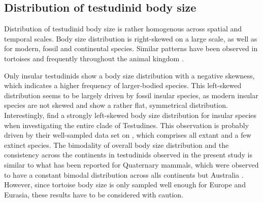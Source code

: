 






\subsection{Distribution of testudinid body size}

Distribution of testudinid body size is rather homogenous across spatial and temporal scales.
Body size distribution is right-skewed on a large scale, as well as for modern, fossil and continental species. Similar patterns have been observed in tortoises \citep{Angielczyk2015,Jaffe2011a} and frequently throughout the animal kingdom \citep{Blackburn1994a,Kozlowski2002}.

Only insular testudinids show a body size distribution with a negative skewness, which indicates a higher frequency of larger-bodied species. This left-skewed distribution seems to be largely driven by fossil insular species, as modern insular species are not skewed and show a rather flat, symmetrical distribution. Interestingly, \cite{Angielczyk2015} find a strongly left-skewed body size distribution for insular species when investigating the entire clade of Testudines. This observation is probably driven by their well-sampled data set on \T, which comprises all extant and a few extinct species. 
The bimodality of overall body size distribution and the consistency across the continents in testudinids observed in the present study is similar to what has been reported for Quaternary mammals, which were observed to have a constant bimodal distribution across alls continents but Australia \citep{Lyons2008,Smith2004}.
However, since tortoise body size is only sampled well enough for Europe and Eurasia, these results have to be considered with caution.

